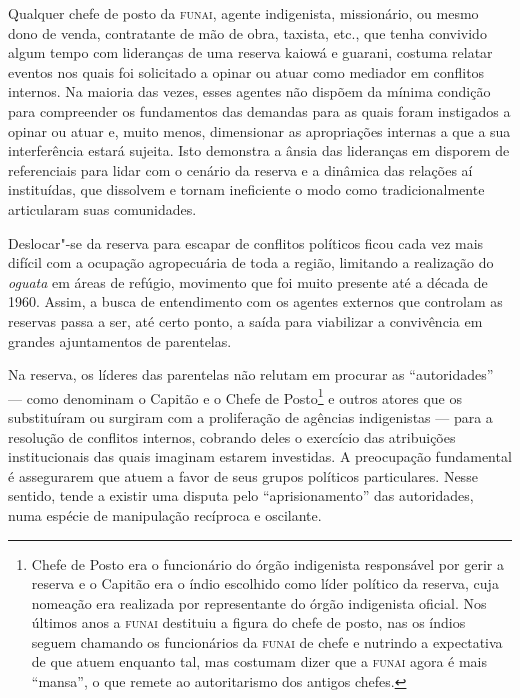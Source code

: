 Qualquer chefe de posto da \textsc{funai}, agente indigenista, missionário, ou
mesmo dono de venda, contratante de mão de obra, taxista, etc., que
tenha convivido algum tempo com lideranças de uma reserva kaiowá e
guarani, costuma relatar eventos nos quais foi solicitado a opinar ou
atuar como mediador em conflitos internos. Na maioria das vezes, esses
agentes não dispõem da mínima condição para compreender os fundamentos
das demandas para as quais foram instigados a opinar ou atuar e, muito
menos, dimensionar as apropriações internas a que a sua interferência
estará sujeita. Isto demonstra a ânsia das lideranças em disporem de
referenciais para lidar com o cenário da reserva e a dinâmica das
relações aí instituídas, que dissolvem e tornam ineficiente o modo como
tradicionalmente articularam suas comunidades. 

Deslocar"-se da reserva para escapar de conflitos políticos ficou cada
vez mais difícil com a ocupação agropecuária de toda a região,
limitando a realização do \emph{oguata} em áreas de refúgio, movimento que foi
muito presente até a década de 1960. Assim, a busca de entendimento com
os agentes externos que controlam as reservas passa a ser, até certo
ponto, a saída para viabilizar a convivência em grandes ajuntamentos de
parentelas. 

Na reserva, os líderes das parentelas não relutam em procurar as
``autoridades'' --- como denominam o Capitão e o Chefe de
Posto\footnote{Chefe de Posto era o funcionário do órgão indigenista
responsável por gerir a reserva e o Capitão era o índio escolhido como
líder político da reserva, cuja nomeação era realizada por
representante do órgão indigenista oficial. Nos últimos anos a \textsc{funai}
destituiu a figura do chefe de posto, nas os índios seguem chamando os
funcionários da \textsc{funai} de chefe e nutrindo a expectativa de que atuem
enquanto tal, mas costumam dizer que a \textsc{funai} agora é mais ``mansa'', o
que remete ao autoritarismo dos antigos chefes.} e outros atores que os
substituíram ou surgiram com a proliferação de agências indigenistas ---
para a resolução de conflitos internos, cobrando deles o exercício das
atribuições institucionais das quais imaginam estarem investidas. A
preocupação fundamental é assegurarem que atuem a favor de seus grupos
políticos particulares. Nesse sentido, tende a existir uma disputa pelo
``aprisionamento'' das autoridades, numa espécie de manipulação recíproca
e oscilante.

